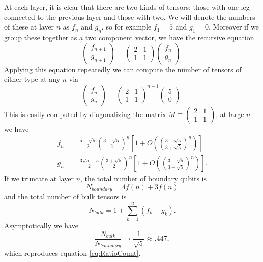 \documentclass[12pt]{article}
\theoremstyle{plain}
\theoremstyle{plain}
\theoremstyle{plain}
\theoremstyle{plain}
\theoremstyle{result}
\theoremstyle{remark}
\theoremstyle{conjecture}
\theoremstyle{observation}
\theoremstyle{definition}
\theoremstyle{corollary}
\theoremstyle{definition}
\theoremstyle{definition}
\theoremstyle{assumption}
\theoremstyle{definition}
\theoremstyle{problem}
\theoremstyle{fact}
\newcommand{\be}{\begin{equation}}
\newcommand{\ee}{\end{equation}}
\begin{document}
At each layer, it is clear that there are two kinds of tensors: those with one leg connected to the previous layer and those with two.  We will denote the numbers of these at layer $n$ as $f_n$ and $g_n$, so for example $f_1=5$ and $g_1=0$.  Moreover if we group these together as a two component vector, we have the recursive equation
\be
\begin{pmatrix}
f_{n+1}\\
g_{n+1}
\end{pmatrix}
=
\begin{pmatrix}
2 & 1\\
1 & 1
\end{pmatrix}
\begin{pmatrix}
f_{n}\\
g_{n}
\end{pmatrix}.
\ee
Applying this equation repeatedly we can compute the number of tensors of either type at any $n$ via
\be
\begin{pmatrix}
f_{n}\\
g_{n}
\end{pmatrix}
=\begin{pmatrix}
2 & 1\\
1 & 1
\end{pmatrix}^{n-1}
\begin{pmatrix}
5\\
0
\end{pmatrix}.
\ee 
This is easily computed by diagonalizing the matrix $M\equiv \begin{pmatrix}2 & 1\\1 & 1\end{pmatrix}$, at large $n$ we have
\begin{align}\nonumber
f_n&=\frac{5-\sqrt{5}}{2}\left(\frac{3+\sqrt{5}}{2}\right)^n\left[1+O\left(\left(\frac{3-\sqrt{5}}{3+\sqrt{5}}\right)^n\right)\right]\\
g_n&=\frac{3\sqrt{5}-5}{2}\left(\frac{3+\sqrt{5}}{2}\right)^n\left[1+O\left(\left(\frac{3-\sqrt{5}}{3+\sqrt{5}}\right)^n\right)\right].
\end{align}
If we truncate at layer $n$, the total number of boundary qubits is
\be
N_{boundary}=4f(n)+3f(n)
\ee
and the total number of bulk tensors is
\be
N_{bulk}=1+\sum_{k=1}^n(f_k+g_k).
\ee
Asymptotically we have
\be\label{pentrate}
\frac{N_{bulk}}{N_{boundary}}\to \frac{1}{\sqrt{5}}\approx .447,
\ee
which reproduces equation \eqref{eq:RatioCount}.  
\end{document}
